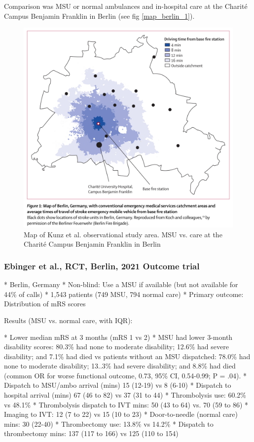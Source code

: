 Comparison was MSU or normal ambulances and in-hospital care at the Charité Campus Benjamin Franklin in Berlin (see fig \ref{map_berlin_1}).

\begin{figure}
    \centering
    \includegraphics[width=0.5\linewidth]{images_background/berlin_map_1_.png}
    \caption{Map of Kunz et al. observational study area. MSU vs. care at the Charité Campus Benjamin Franklin in Berlin }
    \label{fig:map_berlin_1}
\end{figure}


\subsubsection{Ebinger et al., RCT, Berlin, 2021 Outcome trial \cite{ebinger_association_2021}}

\begin{markdown}
* Berlin, Germany
* Non-blind: Use a MSU if available (but not available for 44\% of calls)
* 1,543 patients (749 MSU, 794 normal care)
* Primary outcome: Distribution of mRS scores
\end{markdown}

Results (MSU vs. normal care, with IQR):

\begin{markdown}
* Lower median mRS at 3 months (mRS 1 vs 2)
* MSU had lower 3-month  disability scores: 80.3\% had none to moderate disability; 12.6\% had severe disability; and 7.1\% had died vs patients without an MSU dispatched: 78.0\% had none to moderate disability; 13..3\% had severe disability; and 8.8\% had died (common OR for worse functional outcome, 0.73, 95\% CI, 0.54-0.99; P = .04).
* Dispatch to MSU/ambo arrival (mins) 15 (12-19) vs 8 (6-10)
* Dispatch to hospital arrival (mins) 67 (46 to 82) vs 37 (31 to 44)
* Thrombolysis use: 60.2\% vs 48.1\%
* Thrombolysis dispatch to IVT mins: 50 (43 to 64) vs. 70 (59 to 86)
* Imaging to IVT: 12 (7 to 22) vs 15 (10 to 23)
* Door-to-needle (normal care) mins: 30 (22-40)
* Thrombectomy use: 13.8\% vs 14.2\%
* Dispatch to thrombectomy mins: 137 (117 to 166) vs 125 (110 to 154)
\end{markdown}

